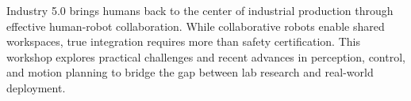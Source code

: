 Industry 5.0 brings humans back to the center of industrial production through effective human-robot collaboration.
While collaborative robots enable shared workspaces, true integration requires more than safety certification. 
This workshop explores practical challenges and recent advances in perception, control, and motion planning to bridge the gap between lab research and real-world deployment.
